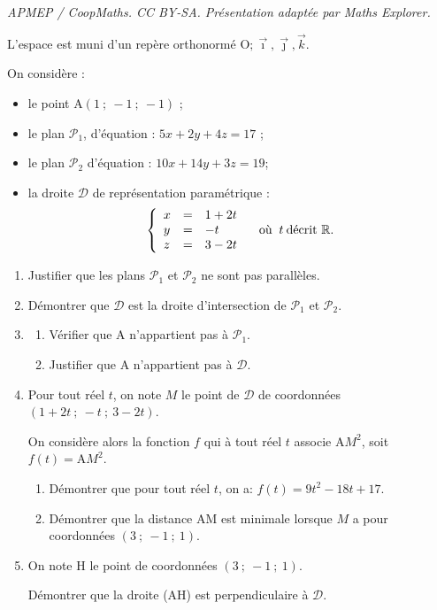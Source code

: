 \documentclass[10pt]{article}
\providecommand{\R}{\mathbb{R}}
\providecommand{\Oijk}{\(\mathrm{O};\vec{\imath},\vec{\jmath},\vec{k}\)}
\begin{document}
\noindent\textit{APMEP / CoopMaths. CC BY-SA. Présentation adaptée par Maths Explorer.}\par\medskip
\medskip

L'espace est muni d'un repère orthonormé \Oijk. 

On considère :

\begin{itemize}
\item[$\bullet~~$]le point A$(1~;~-1~;~-1)$ ;
\item[$\bullet~~$]le plan $\mathcal{P}_1$, d'équation : $5x +2y + 4z= 17$ ;
\item[$\bullet~~$]le plan $\mathcal{P}_2$ d'équation : $10x+ 14y + 3z = 19$;
\item[$\bullet~~$]la droite $\mathcal{D}$ de représentation paramétrique :
\[\left\{\begin{array}{l c l}
x &=& 1+2t\\
y &=& - t\\ 
z&=&3-2t
\end{array}\right. \quad \text{où } \:t \:\text{décrit } \R.\]
\end{itemize}

\begin{enumerate}
\item Justifier que les plans $\mathcal{P}_1$ et $\mathcal{P}_2$ ne sont pas parallèles.
\item Démontrer que $\mathcal{D}$ est la droite d'intersection de $\mathcal{P}_1$ et $\mathcal{P}_2$.
\item 
	\begin{enumerate}
		\item Vérifier que A n'appartient pas à $\mathcal{P}_1$.
		\item Justifier que A n'appartient pas à $\mathcal{D}$.
	\end{enumerate}
\item  Pour tout réel $t$, on note $M$ le point de $\mathcal{D}$ de coordonnées $(1 +2t~;~-t~;~3 - 2t)$.

On considère alors la fonction $f$ qui à tout réel $t$ associe A$M^2$, soit $f(t) = \text{A}M^2$.
	\begin{enumerate}
		\item Démontrer que pour tout réel $t$, on a: $f(t) = 9t^2 - 18t + 17$.
		\item Démontrer que la distance AM est minimale lorsque $M$ a pour
coordonnées $(3~;~-1~;~1)$.
	\end{enumerate}
\item  On note H le point de coordonnées $(3~;~-1~;~1)$.

Démontrer que la droite (AH) est perpendiculaire à $\mathcal{D}$.
\end{enumerate}

\bigskip
\end{document}
